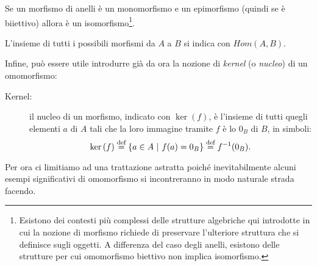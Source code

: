 		\begin{fatto}
			Se un morfismo di anelli è un monomorfismo e un epimorfismo (quindi se è biiettivo) allora è un isomorfismo\footnote{Esistono dei contesti più complessi delle strutture algebriche qui introdotte in cui la nozione di morfismo richiede di preservare l'ulteriore struttura che si definisce sugli oggetti. A differenza del caso degli anelli, esistono delle strutture per cui omomorfismo biettivo non implica isomorfismo.}.
		\end{fatto}
		L'insieme di tutti i possibili morfismi da $A$ a $B$ si indica con $Hom(A,B)$.
		
		Infine, può essere utile introdurre già da ora la nozione di \emph{kernel} (o \emph{nucleo}) di un omomorfismo:
		\begin{description}
			\item[Kernel:] il nucleo di un morfismo, indicato con $\ker{(f)}$, è l'insieme di tutti quegli elementi $a$ di $A$ tali che la loro immagine tramite $f$ è lo $0_B$ di $B$, in simboli: 
			\begin{equation*} 
				\ker{(f)}\stackrel{\text{def}}{=}\{a\in A\ \rvert\  f(a)=0_B\}\stackrel{\text{def}}{=} f^{-1}(0_B).
			\end{equation*}
		\end{description}
		
		Per ora ci limitiamo ad una trattazione astratta poiché inevitabilmente alcuni esempi significativi di omomorfismo si incontreranno in modo naturale strada facendo.
		
		
		
